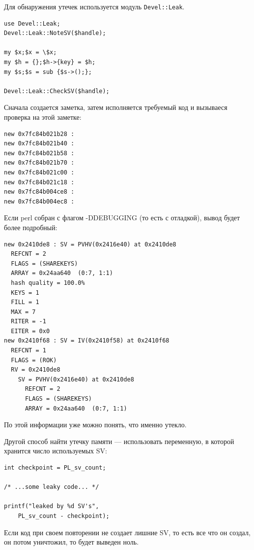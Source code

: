 Для обнаружения утечек используется модуль \verb|Devel::Leak|.
\begin{verbatim}
use Devel::Leak;
Devel::Leak::NoteSV($handle);

my $x;$x = \$x;
my $h = {};$h->{key} = $h;
my $s;$s = sub {$s->();};

Devel::Leak::CheckSV($handle);
\end{verbatim}
Сначала создается заметка, затем исполняется требуемый код и вызываеся проверка на этой заметке:
\begin{verbatim}
new 0x7fc84b021b28 :
new 0x7fc84b021b40 :
new 0x7fc84b021b58 :
new 0x7fc84b021b70 :
new 0x7fc84b021c00 :
new 0x7fc84b021c18 :
new 0x7fc84b004ce8 :
new 0x7fc84b004ec8 :
\end{verbatim}
Если perl собран с флагом -DDEBUGGING (то есть с отладкой), вывод будет более подробный:
\begin{verbatim}
new 0x2410de8 : SV = PVHV(0x2416e40) at 0x2410de8
  REFCNT = 2
  FLAGS = (SHAREKEYS)
  ARRAY = 0x24aa640  (0:7, 1:1)
  hash quality = 100.0%
  KEYS = 1
  FILL = 1
  MAX = 7
  RITER = -1
  EITER = 0x0
new 0x2410f68 : SV = IV(0x2410f58) at 0x2410f68
  REFCNT = 1
  FLAGS = (ROK)
  RV = 0x2410de8
    SV = PVHV(0x2416e40) at 0x2410de8
      REFCNT = 2
      FLAGS = (SHAREKEYS)
      ARRAY = 0x24aa640  (0:7, 1:1)
\end{verbatim}
По этой информации уже можно понять, что именно утекло.

Другой способ найти утечку памяти --- использовать переменную, в которой хранится число используемых SV:
\begin{verbatim}
int checkpoint = PL_sv_count;

/* ...some leaky code... */

printf("leaked by %d SV's",
    PL_sv_count - checkpoint);
\end{verbatim}
Если код при своем повторении не создает лишние SV, то есть все что он создал, он потом уничтожил, то будет выведен ноль.

